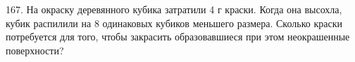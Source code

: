 167. На окраску деревянного кубика затратили 4 г краски. Когда она высохла, кубик распилили на 8 одинаковых кубиков меньшего размера. Сколько краски потребуется для того, чтобы закрасить образовавшиеся при этом неокрашенные поверхности?\\
